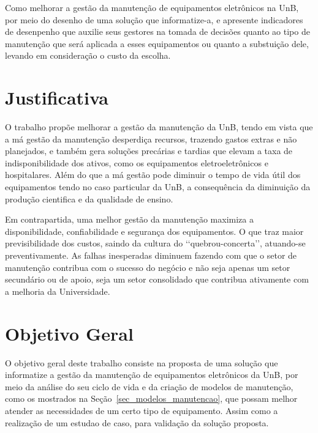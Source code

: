 Como melhorar a gestão da manutenção de equipamentos eletrônicos na UnB, por meio do desenho de uma solução que informatize-a, e apresente indicadores de desenpenho que auxilie seus gestores na tomada de decisões quanto ao tipo de manutenção que será aplicada a esses equipamentos ou quanto a substuição dele, levando em consideração o custo da escolha. 


\section{Justificativa}

O trabalho propõe melhorar a gestão da manutenção da UnB, tendo em vista que a má gestão da manutenção desperdiça recursos, trazendo gastos extras e não planejados, e também gera soluções precárias e tardias que elevam a taxa de indisponibilidade dos ativos, como os equipamentos eletroeletrônicos e hospitalares. Além do que a má gestão pode diminuir o tempo de vida útil dos equipamentos tendo no caso particular da UnB, a consequência da diminuição da produção cientifica e da qualidade de ensino.

Em contrapartida, uma melhor gestão da manutenção maximiza a disponibilidade, confiabilidade e segurança dos equipamentos. O que traz maior previsibilidade dos custos, saindo da cultura do \lq\lq quebrou-concerta\rq\rq, atuando-se preventivamente. As falhas inesperadas diminuem fazendo com que o setor de manutenção contribua com o sucesso do negócio e não seja apenas um setor secundário ou de apoio, seja um setor consolidado que contribua ativamente com a melhoria da Universidade.




\section{Objetivo Geral}
 
O objetivo geral deste trabalho consiste na proposta de uma solução que informatize a gestão da manutenção de equipamentos eletrônicos da UnB, por meio da análise do seu ciclo de vida e da criação de modelos de manutenção, como os mostrados na Seção~\ref{sec_modelos_manutencao}, que possam melhor atender as necessidades de um certo tipo de equipamento. Assim como a realização de um estudao de caso, para validação da solução proposta. 

